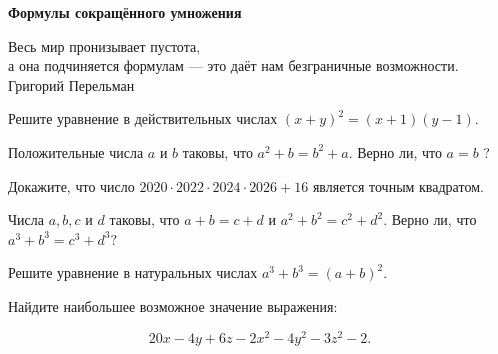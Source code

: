 \centerline{\bf \Huge Формулы сокращённого умножения}
\centerline{\bf \Huge }

\begin{flushright}
        \scriptsize{Весь мир пронизывает пустота,\\ а она подчиняется формулам — это даёт нам безграничные возможности.\\ Григорий Перельман}
\end{flushright}

Решите уравнение в действительных числах $(x+y)^2=(x+1)(y-1)$.

Положительные числа $a$ и $b$ таковы, что $a^2+b=b^2+a$. Верно ли, что $a=b$ ?

Докажите, что число $2020 \cdot 2022 \cdot 2024 \cdot 2026+16$ является точным квадратом.

Числа $a, b, c$ и $d$ таковы, что $a+b=c+d$ и $a^2+b^2=c^2+d^2$. Верно ли, что $a^3+b^3=c^3+d^3?$

Решите уравнение в натуральных числах $a^3+b^3=(a+b)^2$.

Найдите наибольшее возможное значение выражения:

$$
20 x-4 y+6 z-2 x^2-4 y^2-3 z^2-2 .
$$